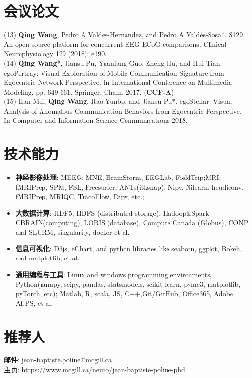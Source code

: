\documentclass{resume}
\begin{document}
\section{会议论文}
(13) \textbf{Qing Wang}, Pedro A Valdes-Hernandez, and Pedro A Vald{\'e}s-Sosa*. S129. An open source platform for concurrent EEG ECoG comparisons. Clinical Neurophysiology 129 (2018): e190.\\
(14) \textbf{Qing Wang}*, Jiansu Pu, Yuanfang Guo, Zheng Hu, and Hui Tian. egoPortray: Visual Exploration of Mobile Communication Signature from Egocentric Network Perspective. In International Conference on Multimedia Modeling, pp. 649-661. Springer, Cham, 2017. (\textbf{CCF-A})\\
(15) Han Mei, \textbf{Qing Wang}, Rao Yunbo, and Jiansu Pu*. egoStellar: Visual Analysis of Anomalous Communication Behaviors from Egocentric Perspective. In Computer and Information Science Communications 2018.\\

\section{技术能力}
\begin{itemize}[parsep=0.2ex]
  \item \textbf{神经影像处理}: MEEG: MNE, BrainStorm, EEGLab, FieldTrip;MRI: fMRIPrep, SPM, FSL, Freesurfer, ANTs(itksnap), Nipy, Nilearn, heudiconv, fMRIPrep, MRIQC, TracoFlow, Dipy, etc.;
  \item \textbf{大数据计算}: HDF5, HDFS (distributed storage), Hadoop\&Spark, CBRAIN(computing), LORIS (database), Compute Canada (Globus), CONP and SLURM, singularity, docker et al.
  \item \textbf{信息可视化}: D3js, eChart, and python libraries like seaborn, ggplot, Bokeh, and matplotlib, et al.
  \item \textbf{通用编程与工具}: Linux and windows programming environments, Python(numpy, scipy, pandas, statsmodels, scikit-learn, pymc3, matplotlib, pyTorch, etc); Matlab, R, scala, JS, C++,Git/GitHub, Office365, Adobe AI,PS, et al.
\end{itemize}

\section{推荐人}
\textbf{邮件}: \href{jean-baptiste.poline@mcgill.ca}{jean-baptiste.poline@mcgill.ca}\\
主页: \href{https://www.mcgill.ca/neuro/jean-baptiste-poline-phd}{https://www.mcgill.ca/neuro/jean-baptiste-poline-phd}\\
\end{document}
